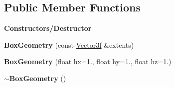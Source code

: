 \subsection*{Public Member Functions}
\begin{Indent}\textbf{ Constructors/\+Destructor}\par
\begin{DoxyCompactItemize}
\item 
\mbox{\label{classrev_1_1_box_geometry_ab0c2ec59df4ce1f3b0455616ca980b12}} 
{\bfseries Box\+Geometry} (const \mbox{\hyperlink{classrev_1_1_vector}{Vector3f}} \&extents)
\item 
\mbox{\label{classrev_1_1_box_geometry_a4f112f6c660c677b6d63b9b029fee9bc}} 
{\bfseries Box\+Geometry} (float hx=1., float hy=1., float hz=1.)
\item 
\mbox{\label{classrev_1_1_box_geometry_abe55ad941301f23a2b56a7eb3fdf2a95}} 
{\bfseries $\sim$\+Box\+Geometry} ()
\end{DoxyCompactItemize}
\end{Indent}
